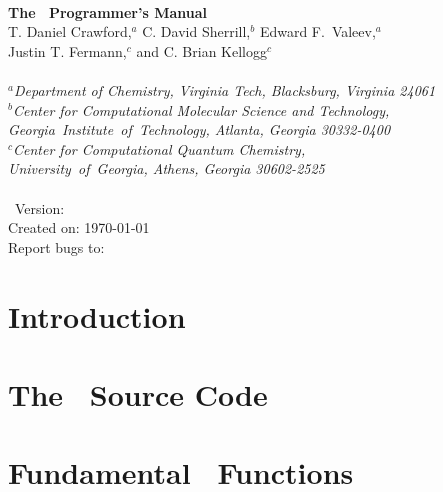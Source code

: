 \documentclass[12pt]{article}
\begin{document}


\initfuncdesc

\begin{center}
\ \\
\vspace{2.0in}
{\bf {\Large The \PSIthree\ Programmer's Manual}} \\
\vspace{0.5in} 
T. Daniel Crawford,$^a$ C. David Sherrill,$^b$ Edward F.\ Valeev,$^{a}$ \\
Justin T. Fermann,$^c$ and C. Brian Kellogg$^c$ \\ 
\ \\ 
{\em $^a$Department of Chemistry, Virginia Tech, Blacksburg, Virginia 24061} \\
\vspace{0.1in}
{\em $^b$Center for Computational Molecular Science and Technology, 
\mbox{Georgia Institute of Technology,} Atlanta, Georgia 30332-0400} \\
\vspace{0.1in}
{\em $^c$Center for Computational Quantum Chemistry, \\ 
\mbox{University of Georgia,} Athens, Georgia 30602-2525} \\
\ \\
\vspace{0.3in}
\PSIthree\ Version: \PSIversion \\
Created on: \today \\
Report bugs to: \PSIemail \\
\end{center}

\thispagestyle{empty}

\newpage
\tableofcontents

\newpage
\section{Introduction}



\section{The \PSIthree\ Source Code}\label{cvs}


\section{Fundamental \PSIthree\ Functions}\label{Fundamental_PSI}

\end{document}
